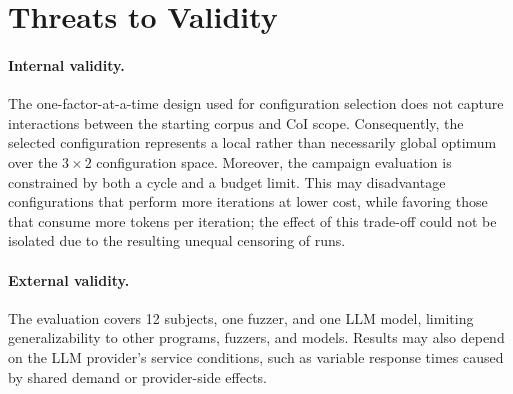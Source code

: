 \section{Threats to Validity}\label{sec:eval:threats}

\paragraph{Internal validity.}
The one-factor-at-a-time design used for configuration selection does not capture interactions between the starting corpus and \ac{CoI} scope.
Consequently, the selected configuration represents a local rather than necessarily global optimum over the $3\times2$ configuration space.
Moreover, the campaign evaluation is constrained by both a cycle and a budget limit.
This may disadvantage configurations that perform more iterations at lower cost, while favoring those that consume more tokens per iteration; the effect of this trade-off could not be isolated due to the resulting unequal censoring of runs.

\paragraph{External validity.}
The evaluation covers \num{12} subjects, one fuzzer, and one \ac{LLM} model, limiting generalizability to other programs, fuzzers, and models.
Results may also depend on the \ac{LLM} provider's service conditions, such as variable response times caused by shared demand or provider-side effects.